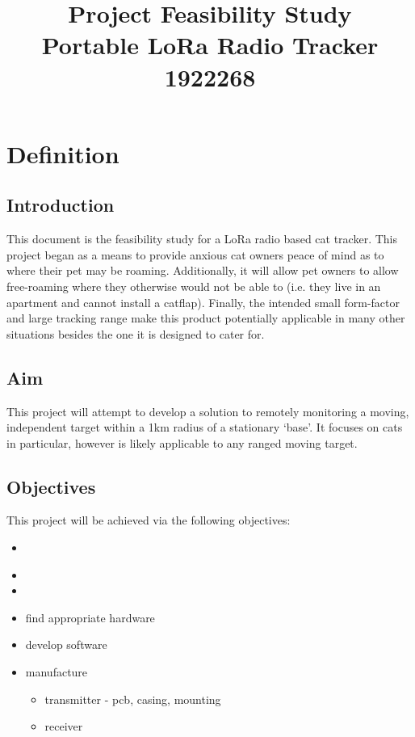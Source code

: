 \documentclass[11pt]{article}
\title{\huge Project Feasibility Study\\\Large Portable LoRa Radio Tracker\vspace{0.4em}\\\large 1922268\vspace{-2em}}
\author{}
\date{}
\begin{document}
\maketitle

\section{Definition}
\subsection{Introduction}
This document is the feasibility study for a LoRa radio based cat tracker.
This project began as a means to provide anxious cat owners peace of mind as to where their pet may be roaming.
Additionally, it will allow pet owners to allow free-roaming where they otherwise would not be able to (i.e. they live in an apartment and cannot install a catflap).
Finally, the intended small form-factor and large tracking range make this product potentially applicable in many other situations besides the one it is designed to cater for.

\subsection{Aim}
This project will attempt to develop a solution to remotely monitoring a moving,
independent target within a 1km radius of a stationary `base'.
It focuses on cats in particular, however is likely applicable to any ranged moving target.
\subsection{Objectives}
This project will be achieved via the following objectives:
\begin{itemize}
    \item 
\end{itemize}

\begin{itemize}
    \item 
    \item 
    \item find appropriate hardware
    \item develop software
    \item manufacture
    \begin{itemize}
        \item transmitter - pcb, casing, mounting
        \item receiver
    \end{itemize}
\end{itemize}
\end{document}
